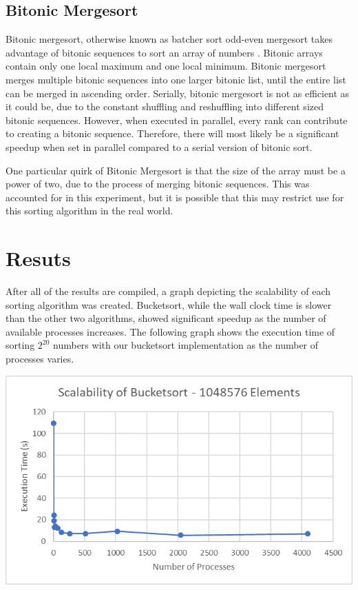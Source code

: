 \documentclass[10pt,letterpaper]{article}
\begin{document}
\begin{multicols}{2}
\subsection{Bitonic Mergesort}

Bitonic mergesort, otherwise known as batcher sort odd-even mergesort takes advantage of bitonic sequences to sort an array of numbers \cite{bitonic}. Bitonic arrays contain only one local maximum and one local minimum. Bitonic mergesort merges multiple bitonic sequences into one larger bitonic list, until the entire list can be merged in ascending order. Serially, bitonic mergesort is not as efficient as it could be, due to the constant shuffling and reshuffling into different sized bitonic sequences. However, when executed in parallel, every rank can contribute to creating a bitonic sequence. Therefore, there will most likely be a significant speedup when set in parallel compared to a serial version of bitonic sort.

One particular quirk of Bitonic Mergesort is that the size of the array must be a power of two, due to the process of merging bitonic sequences. This was accounted for in this experiment, but it is possible that this may restrict use for this sorting algorithm in the real world.

\section{Resuts}

After all of the results are compiled, a graph depicting the scalability of each sorting algorithm was created. Bucketsort, while the wall clock time is slower than the other two algorithms, showed significant speedup as the number of available processes increases. The following graph shows the execution time of sorting $2^{20}$ numbers with our bucketsort implementation as the number of processes varies.

\begin{center}
\includegraphics[scale=1]{bucketsort_1048576}
\end{center}


\end{multicols}
\end{document}
